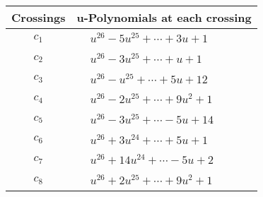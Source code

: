 \documentclass[1p]{elsarticle_modified}
\theoremstyle{definition}
\begin{document}
\begin{tabular}{m{50pt}|m{274pt}}
Crossings & \hspace{64pt}u-Polynomials at each crossing \\
\hline $$\begin{aligned}c_{1}\end{aligned}$$&$\begin{aligned}
&u^{26}-5 u^{25}+\cdots+3 u+1
\end{aligned}$\\
\hline $$\begin{aligned}c_{2}\end{aligned}$$&$\begin{aligned}
&u^{26}-3 u^{25}+\cdots+u+1
\end{aligned}$\\
\hline $$\begin{aligned}c_{3}\end{aligned}$$&$\begin{aligned}
&u^{26}- u^{25}+\cdots+5 u+12
\end{aligned}$\\
\hline $$\begin{aligned}c_{4}\end{aligned}$$&$\begin{aligned}
&u^{26}-2 u^{25}+\cdots+9 u^2+1
\end{aligned}$\\
\hline $$\begin{aligned}c_{5}\end{aligned}$$&$\begin{aligned}
&u^{26}-3 u^{25}+\cdots-5 u+14
\end{aligned}$\\
\hline $$\begin{aligned}c_{6}\end{aligned}$$&$\begin{aligned}
&u^{26}+3 u^{24}+\cdots+5 u+1
\end{aligned}$\\
\hline $$\begin{aligned}c_{7}\end{aligned}$$&$\begin{aligned}
&u^{26}+14 u^{24}+\cdots-5 u+2
\end{aligned}$\\
\hline $$\begin{aligned}c_{8}\end{aligned}$$&$\begin{aligned}
&u^{26}+2 u^{25}+\cdots+9 u^2+1
\end{aligned}$\\

\end{tabular}
\end{document}

